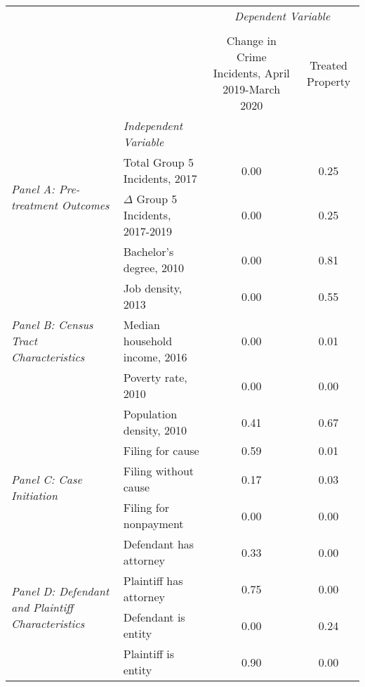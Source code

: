 \begin{tabular}{llcc}
\toprule
 &  & \multicolumn{2}{c}{\textit{Dependent Variable}} \\
\cline{3-4}
\\
 &  & Change in Crime Incidents, April 2019-March 2020 & Treated Property \\
 & \emph{Independent Variable} &  &  \\
\midrule
\multirow[c]{2}{3cm}{\textit{Panel A: Pre-treatment Outcomes}} & Total Group 5 Incidents, 2017 & 0.00 & 0.25 \\
 & $\Delta$ Group 5 Incidents, 2017-2019 & 0.00 & 0.25 \\
\cline{1-4}
\multirow[c]{5}{3cm}{\textit{Panel B: Census Tract Characteristics}} & Bachelor's degree, 2010 & 0.00 & 0.81 \\
 & Job density, 2013 & 0.00 & 0.55 \\
 & Median household income, 2016 & 0.00 & 0.01 \\
 & Poverty rate, 2010 & 0.00 & 0.00 \\
 & Population density, 2010 & 0.41 & 0.67 \\
\cline{1-4}
\multirow[c]{3}{3cm}{\textit{Panel C: Case Initiation}} & Filing for cause & 0.59 & 0.01 \\
 & Filing without cause & 0.17 & 0.03 \\
 & Filing for nonpayment & 0.00 & 0.00 \\
\cline{1-4}
\multirow[c]{4}{3cm}{\textit{Panel D: Defendant and Plaintiff Characteristics}} & Defendant has attorney & 0.33 & 0.00 \\
 & Plaintiff has attorney & 0.75 & 0.00 \\
 & Defendant is entity & 0.00 & 0.24 \\
 & Plaintiff is entity & 0.90 & 0.00 \\
\cline{1-4}
\bottomrule
\end{tabular}
